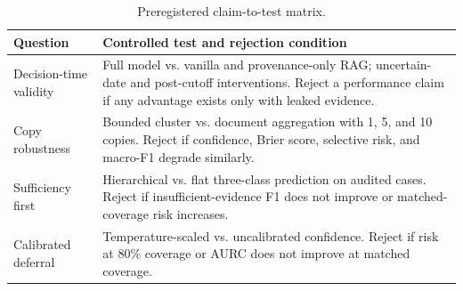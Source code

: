 \begin{table}[t]
\caption{Preregistered claim-to-test matrix.}
\label{tab:evaluation-matrix}
\centering
\scriptsize
\setlength{\tabcolsep}{3pt}
\renewcommand{\arraystretch}{1.10}
\begin{tabularx}{\columnwidth}{>{\raggedright\arraybackslash}p{}Y}
\toprule
\textbf{Question} & \textbf{Controlled test and rejection condition} \\
\midrule
Decision-time validity & Full model vs. vanilla and provenance-only RAG; uncertain-date and post-cutoff interventions. Reject a performance claim if any advantage exists only with leaked evidence. \\
Copy robustness & Bounded cluster vs. document aggregation with 1, 5, and 10 copies. Reject if confidence, Brier score, selective risk, and macro-F1 degrade similarly. \\
Sufficiency first & Hierarchical vs. flat three-class prediction on audited cases. Reject if insufficient-evidence F1 does not improve or matched-coverage risk increases. \\
Calibrated deferral & Temperature-scaled vs. uncalibrated confidence. Reject if risk at 80\% coverage or AURC does not improve at matched coverage. \\
\bottomrule
\end{tabularx}
\end{table}
